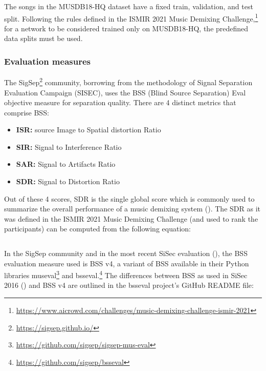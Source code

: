 \documentclass[report.tex]{subfiles}
\begin{document}
The songs in the MUSDB18-HQ dataset have a fixed train, validation, and test split. Following the rules defined in the ISMIR 2021 Music Demixing Challenge,\footnote{\url{https://www.aicrowd.com/challenges/music-demixing-challenge-ismir-2021}} for a network to be considered trained only on MUSDB18-HQ, the predefined data splits must be used.

\subsubsection{Evaluation measures}

The SigSep\footnote{\url{https://sigsep.github.io/}} community, borrowing from the methodology of Signal Separation Evaluation Campaign (SISEC), uses the BSS (Blind Source Separation) Eval \cite{bss} objective measure for separation quality. There are 4 distinct metrics that comprise BSS:

\begin{itemize}
\item
	\textbf{ISR:} source Image to Spatial distortion Ratio
\item
	\textbf{SIR:} Signal to Interference Ratio
\item
	\textbf{SAR:} Signal to Artifacts Ratio
\item
	\textbf{SDR:} Signal to Distortion Ratio
\end{itemize}

Out of these 4 scores, SDR is the single global score which is commonly used to summarize the overall performance of a music demixing system (\cite{sdruseful}). The SDR as it was defined in the ISMIR 2021 Music Demixing Challenge (and used to rank the participants) can be computed from the following equation:

\[ \]

In the SigSep community and in the most recent SiSec evaluation (\cite{sisec2018}), the BSS evaluation measure used is BSS v4, a variant of BSS available in their Python libraries museval\footnote{\url{https://github.com/sigsep/sigsep-mus-eval}} and bsseval.\footnote{\url{https://github.com/sigsep/bsseval}} The differences between BSS as used in SiSec 2016 (\cite{sisec2016}) and BSS v4 are outlined in the bsseval project's GitHub README file:
\end{document}
